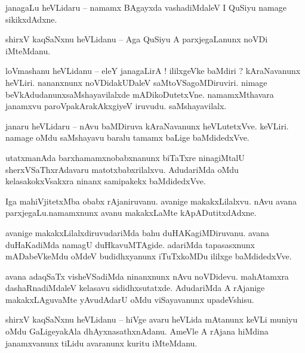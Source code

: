 \documentclass{article}
\begin{document}
\begin{mn}%
janagaLu heVLidaru -- namamx BAgayxda vashadiMdaleV I QuSiyu namage sikikxdAdxne.
\end{mn}

\begin{mn}%
shirxV kaqSaNxnu heVLidanu -- Aga QuSiyu A parxjegaLanunx noVDi iMteMdanu.
\end{mn}

\begin{mn}%
loVmashanu heVLidanu -- eleY janagaLirA ! ililxgeVke baMdiri ? kAraNavanunx heVLiri. nananxnunx 
noVDidakUDaleV saMtoVSagoMDiruviri. nimage beVkAdudanunxsaMshayavilalxde mADikoDutetxVne. 
namamxMthavara janamxvu paroVpakArakAkxgiyeV iruvudu. saMshayavilalx.
\end{mn}

\begin{mn}%
janaru heVLidaru -- nAvu baMDiruva kAraNavanunx heVLutetxVve. keVLiri. namage oMdu saMshayavu 
baralu tamamx baLige baMdidedxVve.
\end{mn}

\begin{mn}%
utatxmanAda barxhamamxnobabxnanunx biTaTxre ninagiMtalU sherxVSaThxrAdavaru matotxbabxrilalxvu. 
AdudariMda oMdu kelasakokxVsakxra ninanx samipakekx baMdidedxVve.
\end{mn}

\begin{mn}%
Iga mahiVjitetxMba obabx rAjaniruvanu. avanige makakxLilalxvu. nAvu avana parxjegaLu.namamxnunx 
avanu makakxLaMte kApADutitxdAdxne.
\end{mn}

\begin{mn}%
avanige makakxLilalxdiruvudariMda bahu duHAKagiMDiruvanu. avana duHaKadiMda namagU duHkavuMTAgide. 
adariMda tapasasxnunx mADabeVkeMdu oMdeV budidhxyanunx iTuTxkoMDu ililxge baMdidedxVve.
\end{mn}

\begin{mn}%
avana adaqSaTx visheVSadiMda ninanxnunx nAvu noVDidevu. mahAtamxra dashaRnadiMdaleV kelasavu 
sididhxsutatxde. AdudariMda A rAjanige makakxLAguvaMte yAvudAdarU oMdu viSayavanunx upadeVshisu.
\end{mn}

\begin{mn}%
shirxV kaqSaNxnu heVLidanu -- hiVge avaru heVLida mAtanunx keVLi muniyu oMdu GaLigeyakAla 
dhAyxnasathxnAdanu. AmeVle A rAjana hiMdina janamxvanunx tiLidu avaranunx kuritu iMteMdanu.
\end{mn}
\end{document}
